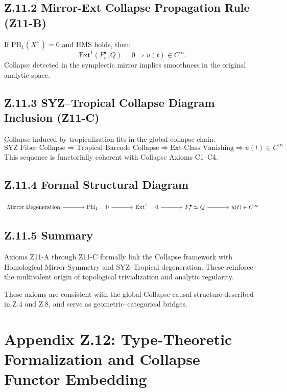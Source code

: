\documentclass[11pt]{article}
\begin{document}
\begin{axiom}
\begin{axiom}
{{\subsection*{Z.11.2 Mirror-Ext Collapse Propagation Rule (Z11-B)}
If \( \mathrm{PH}_1(X^\vee) = 0 \) and HMS holds, then:
\[
\mathrm{Ext}^1(F_t^\bullet, Q) = 0 \Rightarrow u(t) \in C^\infty.
\]
Collapse detected in the symplectic mirror implies smoothness in the original analytic space.

\subsection*{Z.11.3 SYZ–Tropical Collapse Diagram Inclusion (Z11-C)}
Collapse induced by tropicalization fits in the global collapse chain:
\[
\text{SYZ Fiber Collapse} \Rightarrow \text{Tropical Barcode Collapse} \Rightarrow \text{Ext-Class Vanishing} \Rightarrow u(t) \in C^\infty
\]
This sequence is functorially coherent with Collapse Axioms C1–C4.

\subsection*{Z.11.4 Formal Structural Diagram}
\[
\begin{tikzcd}[column sep=large, row sep=large]
\text{Mirror Degeneration} \arrow[r] &
\mathrm{PH}_1 = 0 \arrow[r] &
\mathrm{Ext}^1 = 0 \arrow[r] &
F^\bullet_t \simeq Q \arrow[r] &
u(t) \in C^\infty
\end{tikzcd}
\]

\subsection*{Z.11.5 Summary}
Axioms Z11-A through Z11-C formally link the Collapse framework with Homological Mirror Symmetry and SYZ–Tropical degeneration. These reinforce the multivalent origin of topological trivialization and analytic regularity.

These axioms are consistent with the global Collapse causal structure described in Z.4 and Z.8, and serve as geometric–categorical bridges.



\section*{Appendix Z.12: Type-Theoretic Formalization and Collapse Functor Embedding}

}}
\end{axiom}
\end{axiom}
\end{document}
